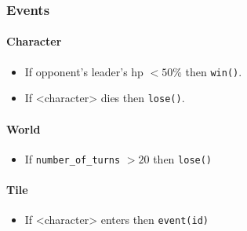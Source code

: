 \subsubsection{Events}
\paragraph{Character}
\begin{itemize}
	\item If opponent's leader's hp $< 50\%$ then \texttt{win()}.
	\item If <character> dies then \texttt{lose()}.
\end{itemize}

\paragraph{World}
\begin{itemize}
	\item If \texttt{number\_of\_turns} $> 20$ then \texttt{lose()} 
\end{itemize}

\paragraph{Tile}
\begin{itemize}
	\item If <character> enters then \texttt{event(id)} 
\end{itemize}

